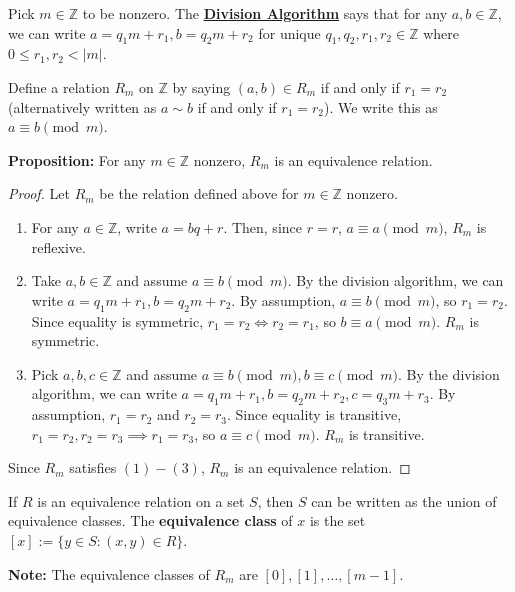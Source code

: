 \documentclass [12pt] {article}
\newcommand{\Z}{\mathbb{Z}}
\newenvironment{definition}[1]{\begin{tcolorbox}[title={Definition: #1},colback=blue!5!white,colframe=black!75!blue]}{\end{tcolorbox}}
\renewcommand{\href}[2]{\hyperref[#1]{\bf{\underline{{#2}}}}}
\renewcommand{\bf}[1]{\textbf{{#1}}}
\begin{document}
Pick $m \in \Z$ to be nonzero. The \href{thm:divalgo}{Division Algorithm} says that for any $a, b
\in \Z$, we can write $a = q_1 m + r_1, b = q_2 m + r_2$ for unique $q_1, q_2, r_1, r_2 \in \Z$
where $0 \leq r_1, r_2 < |m|$.
\begin{definition}{Modulo}
    Define a relation $R_m$ on $\Z$ by saying $(a, b) \in R_m$ if and only if $r_1 = r_2$
    (alternatively written as $a \sim b$ if and only if $r_1 = r_2$). We write this as
    $a \equiv b \pmod{m}$.
\end{definition}
\bf{Proposition:} For any $m \in \Z$ nonzero, $R_m$ is an equivalence relation.
\begin{proof}
    Let $R_m$ be the relation defined above for $m \in \Z$ nonzero.
    \begin{enumerate}[label=(\arabic*)]
        \item For any $a \in \Z$, write $a = bq + r$. Then, since $r = r$, $a \equiv a
            \pmod{m}$, $R_m$ is reflexive.
        \item Take $a, b \in \Z$ and assume $a \equiv b \pmod{m}$. By the division algorithm,
            we can write $a = q_1 m + r_1, b = q_2 m + r_2$. By assumption, $a \equiv b \pmod{m}$,
            so $r_1 = r_2$. Since equality is symmetric, $r_1 = r_2 \iff r_2 = r_1$, so
            $b \equiv a \pmod{m}$. $R_m$ is symmetric.
        \item Pick $a, b, c \in \Z$ and assume $a \equiv b \pmod{m}, b \equiv c \pmod{m}$.
            By the division algorithm, we can write
            $a = q_1 m + r_1, b = q_2 m + r_2, c = q_3 m + r_3$. By assumption, $r_1 = r_2$ and
            $r_2 = r_3$. Since equality is transitive, $r_1 = r_2, r_2 = r_3 \implies r_1 = r_3$,
            so $a \equiv c \pmod{m}$. $R_m$ is transitive.
    \end{enumerate}
    \vspace{-0.5em}
    Since $R_m$ satisfies $(1)-(3)$, $R_m$ is an equivalence relation.
\end{proof}
\begin{definition}{Equivalence Class}
    If $R$ is an equivalence relation on a set $S$, then $S$ can be written as the union of
    equivalence classes. The \bf{equivalence class} of $x$ is the set
    $[x] := \{ y \in S : (x, y) \in R \}$.
    \vspace{0.1em}

    \bf{Note:} The equivalence classes of $R_m$ are $[0], [1], \ldots, [m - 1]$.
\end{definition}
\end{document}

